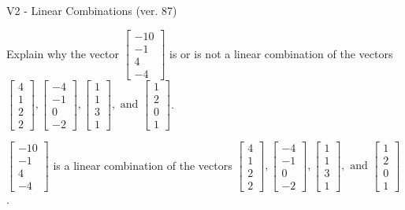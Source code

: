 \begin{exercise}
  \begin{exerciseTitle}V2 - Linear Combinations (ver. 87)\end{exerciseTitle}
  \begin{exerciseStatement}
    Explain why the vector \(\left[\begin{array}{c}
-10 \\
-1 \\
4 \\
-4
\end{array}\right]\)  is or is not a linear 
	combination of the vectors \(\left[\begin{array}{c}
4 \\
1 \\
2 \\
2
\end{array}\right] , \left[\begin{array}{c}
-4 \\
-1 \\
0 \\
-2
\end{array}\right] , \left[\begin{array}{c}
1 \\
1 \\
3 \\
1
\end{array}\right] , \text{ and } \left[\begin{array}{c}
1 \\
2 \\
0 \\
1
\end{array}\right]\).
	


  \end{exerciseStatement}
  \begin{exerciseAnswer}
   \(\left[\begin{array}{c}
-10 \\
-1 \\
4 \\
-4
\end{array}\right]\) 
  	 is  
	a linear combination of the vectors \(\left[\begin{array}{c}
4 \\
1 \\
2 \\
2
\end{array}\right] , \left[\begin{array}{c}
-4 \\
-1 \\
0 \\
-2
\end{array}\right] , \left[\begin{array}{c}
1 \\
1 \\
3 \\
1
\end{array}\right] , \text{ and } \left[\begin{array}{c}
1 \\
2 \\
0 \\
1
\end{array}\right]\).


\end{exerciseAnswer}
\end{exercise}
